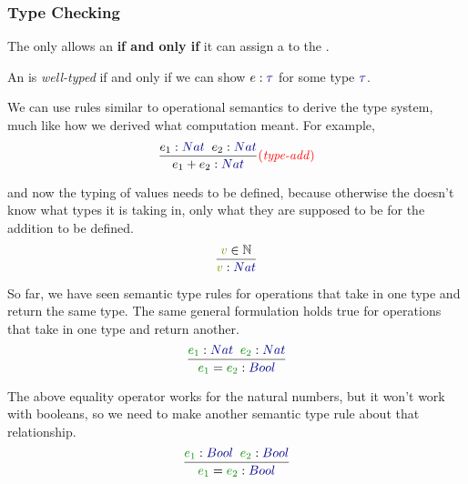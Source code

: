 \subsubsection{Type Checking}\label{subsubsec:Type_System_Checking}
The  only allows an  \textbf{if and only if} it can assign a  to the .

\begin{definition}\label{def:Well_Typed_Expression}
  An  is \emph{well-typed} if and only if we can show $e : \DataType$ for some type $\DataType$.
\end{definition}

We can use rules similar to operational semantics to derive the type system, much like how we derived what computation meant.
For example,
\begin{equation*}
  \dfrac{e_{1} : \SemanticType{Nat} \;\; e_{2} : \SemanticType{Nat}}{e_{1} + e_{2} : \SemanticType{Nat}} \SemanticRuleName{type-add}
\end{equation*}

and now the typing of values needs to be defined, because otherwise the  doesn't know what types it is taking in, only what they are supposed to be for the addition to be defined.
\begin{equation*}
  \dfrac{\SemanticValue{v} \in \NaturalNumbers}{\SemanticValue{v} : \SemanticType{Nat}}
\end{equation*}

So far, we have seen semantic type rules for operations that take in one type and return the same type.
The same general formulation holds true for operations that take in one type and return another.
\begin{equation*}
  \dfrac{\SemanticInput{e_{1}} : \SemanticType{Nat} \;\; \SemanticInput{e_{2}} : \SemanticType{Nat}}{\SemanticInput{e_{1}} = \SemanticInput{e_{2}} : \SemanticType{Bool}}
\end{equation*}

The above equality operator works for the natural numbers, but it won't work with booleans, so we need to make another semantic type rule about that relationship.
\begin{equation*}
  \dfrac{\SemanticInput{e_{1}} : \SemanticType{Bool} \;\; \SemanticInput{e_{2}} : \SemanticType{Bool}}{\SemanticInput{e_{1}} = \SemanticInput{e_{2}} : \SemanticType{Bool}}
\end{equation*}

